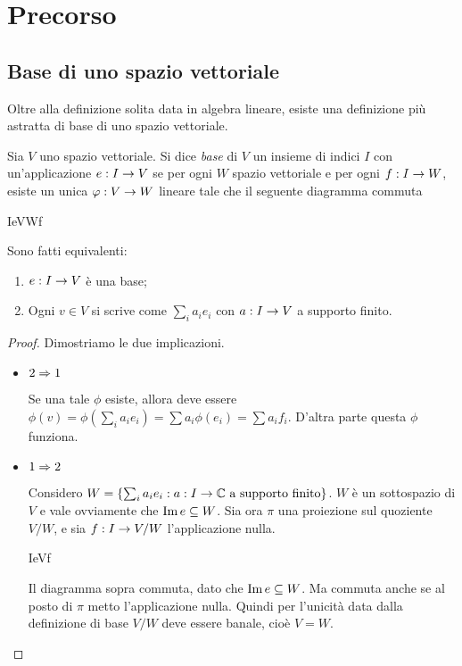 \section{Precorso}

\subsection{Base di uno spazio vettoriale}
  Oltre alla definizione solita data in algebra lineare, esiste una definizione più astratta di base di uno spazio vettoriale.
  \begin{mydef}
    Sia $V$ uno spazio vettoriale. Si dice \emph{base} di $V$ un insieme di indici $I$ con un'applicazione $e: I \rightarrow V$ se per ogni $W$ spazio vettoriale e per ogni $f: I \rightarrow W$, esiste un unica $\varphi: V \rightarrow W$ lineare tale che il seguente diagramma commuta

    	\tridiag IeV\phi Wf

  \end{mydef}

  \begin{myprop}
    Sono fatti equivalenti:
    \begin{enumerate}
    \item $e: I \rightarrow V$ è una base;
    \item Ogni $v \in V$ si scrive come $\sum_i a_ie_i$ con $a: I\rightarrow V$ a supporto finito. 
    \end{enumerate}
  \end{myprop}
  \begin{proof}
    Dimostriamo le due implicazioni.
    \begin{itemize}
      \item $2\Rightarrow 1$
      
      Se una tale $\phi$ esiste, allora deve essere $\phi(v)=\phi(\sum_i a_i e_i) = \sum a_i \phi(e_i) = \sum a_i f_i$. D'altra parte questa $\phi$ funziona.
      
      \item $1 \Rightarrow 2$
      
      Considero $W = \{\sum_i a_ie_i : a:I\rightarrow \mathbb C \mbox{ a supporto finito}\}$. $W$ è un sottospazio di $V$ e vale ovviamente che $\operatorname{Im} e \subseteq W$. Sia ora $\pi$ una proiezione sul quoziente $V/W$, e sia $f: I \rightarrow V/W$ l'applicazione nulla.
	
	\tridiag IeVf
      
      Il diagramma sopra commuta, dato che $\operatorname{Im} e \subseteq W$. Ma commuta anche se al posto di $\pi$ metto l'applicazione nulla. Quindi per l'unicità data dalla definizione di base $V/W$ deve essere banale, cioè $V=W$.
    \end{itemize}
  \end{proof}
  
